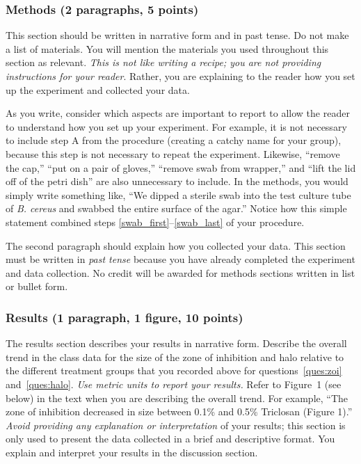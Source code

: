 \documentclass[12pt]{exam}
\begin{document}
\subsubsection*{Methods (2 paragraphs, 5 points)} 

This section should be written in narrative form and in past tense. Do
not make a list of materials. You will mention the materials you used
throughout this section as relevant. \emph{This is not like writing a
recipe; you are not providing instructions for your reader}. Rather, you
are explaining to the reader how you set up the experiment and collected
your data.

As you write, consider which aspects are important to report to allow
the reader to understand how you set up your experiment. For example, it
is not necessary to include step A from the procedure (creating a catchy
name for your group), because this step is not necessary to repeat the
experiment. Likewise, ``remove the cap,'' ``put on a pair of
gloves,'' ``remove swab from wrapper,'' and ``lift the lid off of the petri
dish'' are also unnecessary to include. In the methods, you would simply
write something like, ``We dipped a sterile swab into the test culture
tube of \emph{B. cereus} and swabbed the entire surface of the agar.''
Notice how this simple statement combined steps \ref{swab_first}–\ref{swab_last} of your procedure.

The second paragraph should explain how you
collected your data. This section must be written in \emph{past tense} because you have
already completed the experiment and data collection. No credit will be
awarded for methods sections written in list or bullet form.

\subsubsection*{Results (1 paragraph, 1 figure, 10 points)}


The results section describes your results in narrative
form. Describe the overall trend in the class data for the size of the zone of inhibition and halo 
relative to the different treatment groups that you recorded above for questions~\ref{ques:zoi} and~\ref{ques:halo}. \emph{Use metric
units to report your results.} Refer to Figure~1 (see below) in the text when you are describing 
the overall trend. For example, ``The zone of inhibition decreased in
size between 0.1\% and 0.5\% Triclosan (Figure 1).'' \emph{Avoid
providing any explanation or interpretation} of your results; this
section is only used to present the data collected in a brief and
descriptive format. You explain and interpret your results in the discussion section. 
\end{document}
